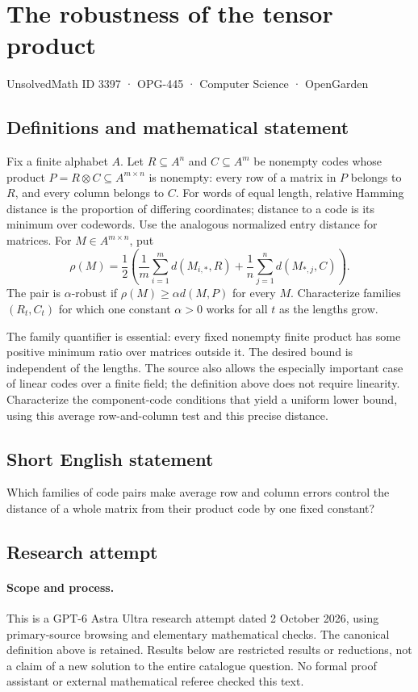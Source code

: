 \documentclass[11pt,a4paper]{article}
\begin{document}
\section*{The robustness of the tensor product}\label{3397}
{\small UnsolvedMath ID 3397 · OPG-445 · Computer Science · OpenGarden}
\subsection{Definitions and mathematical statement}
Fix a finite alphabet $A$. Let $R\subseteq A^n$ and $C\subseteq A^m$
be nonempty codes whose product
$P=R\otimes C\subseteq A^{m\times n}$ is nonempty: every row of
a matrix in $P$ belongs to $R$, and every column belongs to $C$.
For words of equal length, relative Hamming distance is the proportion
of differing coordinates; distance to a code is its minimum over
codewords. Use the analogous normalized entry distance for matrices.
For $M\in A^{m\times n}$, put
\[
 \rho(M)=\frac12\left(\frac1m\sum_{i=1}^m d(M_{i,*},R)
                  +\frac1n\sum_{j=1}^n d(M_{*,j},C)\right).
\]
The pair is $\alpha$-robust if $\rho(M)\ge\alpha d(M,P)$ for every
$M$. Characterize families $(R_t,C_t)$ for which one constant
$\alpha>0$ works for all $t$ as the lengths grow.

The family quantifier is essential: every fixed nonempty finite
product has some positive minimum ratio over matrices outside it.
The desired bound is independent of the lengths. The source also
allows the especially important case of linear codes over a finite
field; the definition above does not require linearity. Characterize
the component-code conditions that yield a uniform lower bound,
using this average row-and-column test and this precise distance.
\subsection{Short English statement}
Which families of code pairs make average row and column errors control the distance of a whole matrix from their product code by one fixed constant?
\subsection{Research attempt}
\paragraph{Scope and process.}
This is a GPT-6 Astra Ultra research attempt dated 2 October 2026, using
primary-source browsing and elementary mathematical checks. The canonical
definition above is retained. Results below are restricted results or
reductions, not a claim of a new solution to the entire catalogue question.
No formal proof assistant or external mathematical referee checked this text.
\end{document}
